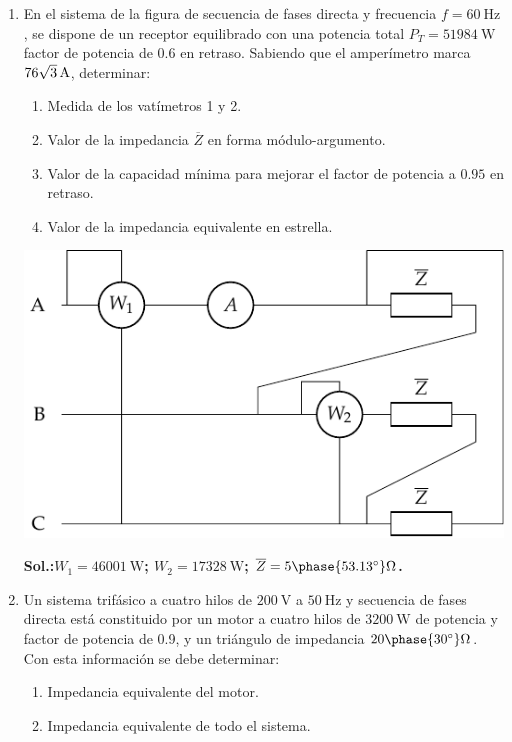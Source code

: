 \begin{enumerate}
\item

  En el sistema de la figura de secuencia de fases directa y
  frecuencia $f=\qty{60}{\hertz}$, se dispone de un receptor
  equilibrado con una potencia total $P_T=\qty{51984}{\watt}$ factor
  de potencia de $0.6$ en retraso. Sabiendo que el amperímetro marca
  $\qty[parse-numbers=false]{76\sqrt{3}}{\ampere}$, determinar:
  \begin{enumerate}
  \item Medida de los vatímetros 1 y 2.
  \item Valor de la impedancia $\overline{Z}$ en forma
    módulo-argumento.
  \item Valor de la capacidad mínima para mejorar el factor de
    potencia a $0.95$ en retraso.
  \item Valor de la impedancia equivalente en estrella.
  \end{enumerate}
  \begin{center}
    \includegraphics[scale=0.8]{../figs/dosvat_triangulo.pdf}
  \end{center}
  \textbf{Sol.:$W_1 = \qty{46001}{\watt}$; $W_2=\qty{17328}{\watt}$;
    $\overline{Z} = {5\phase{\ang{53.13}}}\unit{\ohm}$.}

  
\item Un sistema trifásico a cuatro hilos de $\qty{200}{\volt}$ a $\qty{50}{\hertz}$ y secuencia de fases directa está constituido por un motor a cuatro hilos de $\qty{3200}{\watt}$ de potencia y factor de potencia de 0.9, y un triángulo de impedancia $20\phase{\ang{30}}\unit{\ohm}$. Con esta información se debe determinar:

\begin{enumerate}
\item Impedancia equivalente del motor.
\item Impedancia equivalente de todo el sistema.
\end{enumerate}


\end{enumerate}
